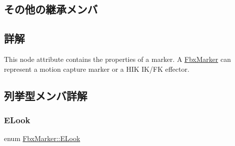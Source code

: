 \subsection*{その他の継承メンバ}


\subsection{詳解}
This node attribute contains the properties of a marker. A \hyperlink{class_fbx_marker}{Fbx\+Marker} can represent a motion capture marker or a H\+IK I\+K/\+FK effector. 

\subsection{列挙型メンバ詳解}
\mbox{\label{class_fbx_marker_a9e1fa9873c0d6da391d82d0de6a352c4}} 
\subsubsection{\texorpdfstring{E\+Look}{ELook}}
{\footnotesize\ttfamily enum \hyperlink{class_fbx_marker_a9e1fa9873c0d6da391d82d0de6a352c4}{Fbx\+Marker\+::\+E\+Look}}

